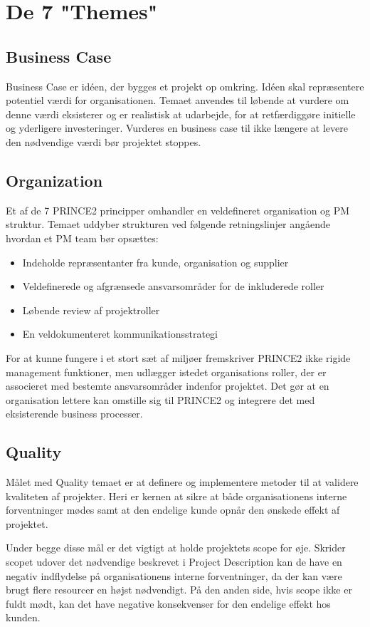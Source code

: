\chapter{De 7 "Themes"}

\section{Business Case}
\label{sec:business_case}
Business Case er idéen, der bygges et projekt op omkring. Idéen skal repræsentere potentiel værdi for organisationen. Temaet anvendes til løbende at vurdere om denne værdi eksisterer og er realistisk at udarbejde, for at retfærdiggøre initielle og yderligere investeringer. Vurderes en business case til ikke længere at levere den nødvendige værdi bør projektet stoppes.

\section{Organization}
Et af de 7 PRINCE2 principper omhandler en veldefineret organisation og PM struktur. Temaet uddyber strukturen ved følgende retningslinjer angående hvordan et PM team bør opsættes:
\begin{itemize}
    \item Indeholde repræsentanter fra kunde, organisation og supplier
    \item Veldefinerede og afgrænsede ansvarsområder for de inkluderede roller
    \item Løbende review af projektroller
    \item En veldokumenteret kommunikationsstrategi
\end{itemize}
For at kunne fungere i et stort sæt af miljøer fremskriver PRINCE2 ikke rigide management funktioner, men udlægger istedet organisations roller, der er associeret med bestemte ansvarsområder indenfor projektet. Det gør at en organisation lettere kan omstille sig til PRINCE2 og integrere det med eksisterende business processer.

\section{Quality}
Målet med Quality temaet er at definere og implementere metoder til at validere kvaliteten af projekter. Heri er kernen at sikre at både organisationens interne forventninger mødes samt at den endelige kunde opnår den ønskede effekt af projektet.

Under begge disse mål er det vigtigt at holde projektets scope for øje. Skrider scopet udover det nødvendige beskrevet i Project Description kan de have en negativ indflydelse på organisationens interne forventninger, da der kan være brugt flere resourcer en højst nødvendigt. På den anden side, hvis scope ikke er fuldt mødt, kan det have negative konsekvenser for den endelige effekt hos kunden.

